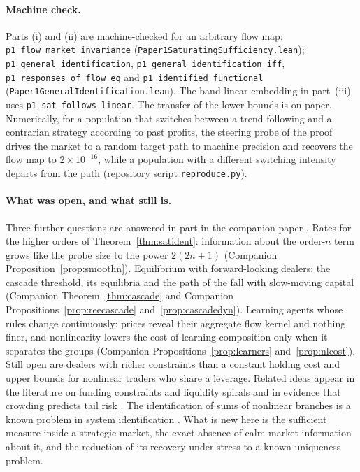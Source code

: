 \documentclass[12pt]{article}
\theoremstyle{definition}
\theoremstyle{remark}
\begin{document}
\paragraph{Machine check.} Parts (i) and (ii) are machine-checked for an arbitrary flow map: \texttt{p1\_flow\_market\_invariance} (\nolinkurl{Paper1SaturatingSufficiency.lean}); \texttt{p1\_general\_identification}, \texttt{p1\_general\_identification\_iff}, \texttt{p1\_responses\_of\_flow\_eq} and \texttt{p1\_identified\_functional} (\nolinkurl{Paper1GeneralIdentification.lean}). The band-linear embedding in part~(iii) uses \texttt{p1\_sat\_follows\_linear}. The transfer of the lower bounds is on paper. Numerically, for a population that switches between a trend-following and a contrarian strategy according to past profits, the steering probe of the proof drives the market to a random target path to machine precision and recovers the flow map to $2\times10^{-16}$, while a population with a different switching intensity departs from the path (repository script \nolinkurl{reproduce.py}).

\paragraph{What was open, and what still is.} Three further questions are answered in part in the companion paper \citep{niroula2026c}. Rates for the higher orders of Theorem~\ref{thm:satident}: information about the order-$n$ term grows like the probe size to the power $2(2n+1)$ (Companion Proposition~\ref{prop:smoothn}). Equilibrium with forward-looking dealers: the cascade threshold, its equilibria and the path of the fall with slow-moving capital (Companion Theorem~\ref{thm:cascade} and Companion Propositions~\ref{prop:reecascade} and~\ref{prop:cascadedyn}). Learning agents whose rules change continuously: prices reveal their aggregate flow kernel and nothing finer, and nonlinearity lowers the cost of learning composition only when it separates the groups (Companion Propositions~\ref{prop:learners} and~\ref{prop:nlcost}). Still open are dealers with richer constraints than a constant holding cost and upper bounds for nonlinear traders who share a leverage. Related ideas appear in the literature on funding constraints and liquidity spirals \citep{brunnermeier2009} and in evidence that crowding predicts tail risk \citep{barroso2022}. The identification of sums of nonlinear branches is a known problem in system identification \citep{dreesen2017}. What is new here is the sufficient measure inside a strategic market, the exact absence of calm-market information about it, and the reduction of its recovery under stress to a known uniqueness problem.
\end{document}
